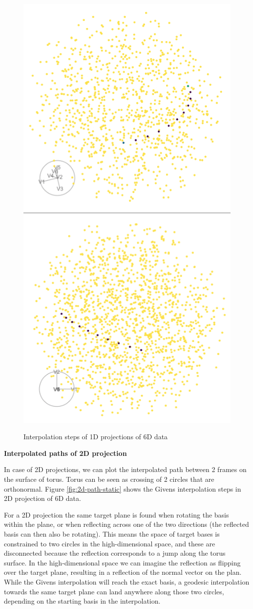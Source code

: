 \begin{figure}

{\centering \includegraphics[width=0.5\linewidth]{sphere_static} \includegraphics[width=0.5\linewidth]{torus_static} 

}

\caption{Interpolation steps of 1D projections of 6D data}\label{fig:1d-path-static}
\end{figure}

\textbf{Interpolated paths of 2D projection}

In case of 2D projections, we can plot the interpolated path between 2 frames on the surface of torus. Torus can be seen as crossing of 2 circles that are orthonormal. Figure \ref{fig:2d-path-static} shows the Givens interpolation steps in 2D projection of 6D data.

For a 2D projection the same target plane is found when rotating the basis within the plane, or when reflecting across one of the two directions (the reflected basis can then also be rotating). This means the space of target bases is constrained to two circles in the high-dimensional space, and these are disconnected because the reflection corresponds to a jump along the torus surface. In the high-dimensional space we can imagine the reflection as flipping over the target plane, resulting in a reflection of the normal vector on the plan.
While the Givens interpolation will reach the exact basis, a geodesic interpolation towards the same target plane can land anywhere along those two circles, depending on the starting basis in the interpolation.

